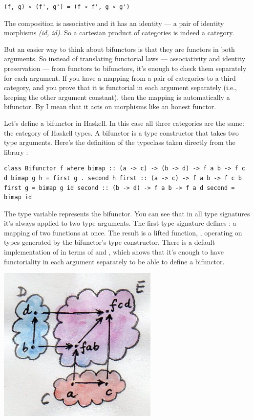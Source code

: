 \begin{verbatim}
(f, g) ∘ (f', g') = (f ∘ f', g ∘ g')
\end{verbatim}

The composition is associative and it has an identity --- a pair of
identity morphisms \emph{(id, id)}. So a cartesian product of categories
is indeed a category.

But an easier way to think about bifunctors is that they are functors in
both arguments. So instead of translating functorial laws ---
associativity and identity preservation --- from functors to bifunctors,
it's enough to check them separately for each argument. If you have a
mapping from a pair of categories to a third category, and you prove
that it is functorial in each argument separately (i.e., keeping the
other argument constant), then the mapping is automatically a bifunctor.
By  I mean that it acts on morphisms like an honest
functor.

Let's define a bifunctor in Haskell. In this case all three categories
are the same: the category of Haskell types. A bifunctor is a type
constructor that takes two type arguments. Here's the definition of the
 typeclass taken directly from the library
:

\begin{verbatim}
class Bifunctor f where bimap :: (a -> c) -> (b -> d) -> f a b -> f c d bimap g h = first g . second h first :: (a -> c) -> f a b -> f c b first g = bimap g id second :: (b -> d) -> f a b -> f a d second = bimap id
\end{verbatim}

The type variable  represents the bifunctor. You can see that
in all type signatures it's always applied to two type arguments. The
first type signature defines : a mapping of two functions
at once. The result is a lifted function,
, operating on types
generated by the bifunctor's type constructor. There is a default
implementation of  in terms of  and
, which shows that it's enough to have functoriality in
each argument separately to be able to define a bifunctor.

\hypertarget{attachment_4070}{}
\includegraphics[width=3.12500in]{images/bimap.jpg}

